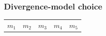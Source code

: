 \begin{frame}[t]
    \frametitle{Divergence-model choice}

    \vspace{-7mm}

    \begin{minipage}[t][0.1\textheight][c]{1.1\linewidth}
        \begin{adjustwidth}{-0.5em}{}
            \begin{tabular}{ p{2.1cm} p{2.1cm} p{2.1cm} p{2.1cm} p{2.1cm} }
                $m_1$ & $m_2$ & $m_3$ & $m_4$ & $m_5$ \\
            \end{tabular}
        \end{adjustwidth}
    \end{minipage}

    \vspace{-2mm}


\end{frame}
